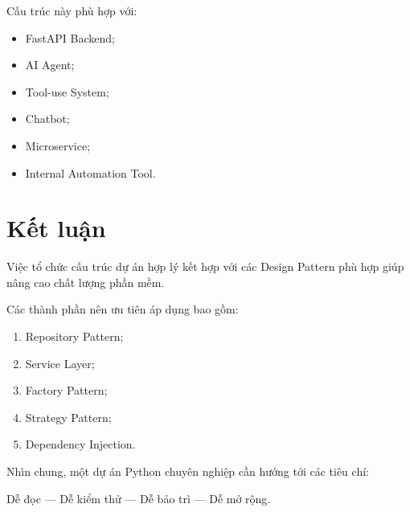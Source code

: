 \documentclass[12pt,a4paper]{article}
\begin{document}
Cấu trúc này phù hợp với:

\begin{itemize}
    \item FastAPI Backend;
    \item AI Agent;
    \item Tool-use System;
    \item Chatbot;
    \item Microservice;
    \item Internal Automation Tool.
\end{itemize}

\section{Kết luận}

Việc tổ chức cấu trúc dự án hợp lý kết hợp với các Design Pattern phù hợp giúp nâng cao chất lượng phần mềm.

Các thành phần nên ưu tiên áp dụng bao gồm:

\begin{enumerate}
    \item Repository Pattern;
    \item Service Layer;
    \item Factory Pattern;
    \item Strategy Pattern;
    \item Dependency Injection.
\end{enumerate}

Nhìn chung, một dự án Python chuyên nghiệp cần hướng tới các tiêu chí:

\begin{center}
Dễ đọc --- Dễ kiểm thử --- Dễ bảo trì --- Dễ mở rộng.
\end{center}
\end{document}
